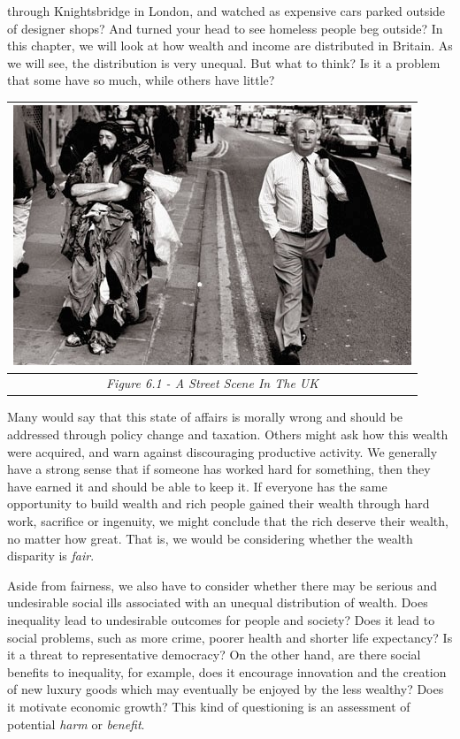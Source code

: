 \documentclass[]{tufte-handout}
\begin{document}
 through Knightsbridge in London, and
watched as expensive cars parked outside of designer shops? And turned
your head to see homeless people beg outside? In this chapter, we will
look at how wealth and income are distributed in Britain. As we will
see, the distribution is very unequal. But what to think? Is it a
problem that some have so much, while others have little?

\begin{longtable}[]{@{}c@{}}
\toprule
\includegraphics{ChapterPictures/6-1-InequalityPic.jpg}\tabularnewline
\midrule
\endhead
\emph{Figure 6.1 - A Street Scene In The UK}\tabularnewline
\bottomrule
\end{longtable}

Many would say that this state of affairs is morally wrong and should be
addressed through policy change and taxation. Others might ask how this
wealth were acquired, and warn against discouraging productive activity.
We generally have a strong sense that if someone has worked hard for
something, then they have earned it and should be able to keep it. If
everyone has the same opportunity to build wealth and rich people gained
their wealth through hard work, sacrifice or ingenuity, we might
conclude that the rich deserve their wealth, no matter how great. That
is, we would be considering whether the wealth disparity is \emph{fair}.

Aside from fairness, we also have to consider whether there may be
serious and undesirable social ills associated with an unequal
distribution of wealth. Does inequality lead to undesirable outcomes for
people and society? Does it lead to social problems, such as more crime,
poorer health and shorter life expectancy? Is it a threat to
representative democracy? On the other hand, are there social benefits
to inequality, for example, does it encourage innovation and the
creation of new luxury goods which may eventually be enjoyed by the less
wealthy? Does it motivate economic growth? This kind of questioning is
an assessment of potential \emph{harm} or \emph{benefit}.
\end{document}
